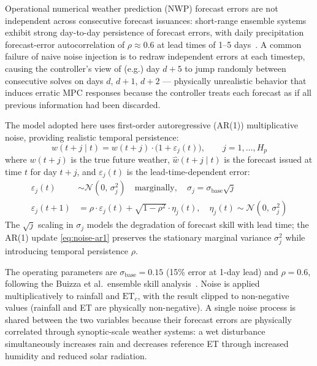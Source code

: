 Operational numerical weather prediction (NWP) forecast errors are not
independent across consecutive forecast issuances: short-range ensemble
systems exhibit strong day-to-day persistence of forecast errors, with daily
precipitation forecast-error autocorrelation of $\rho \approx 0.6$ at
lead times of 1--5 days~\cite{buizza2005}. A common failure of naive noise
injection is to redraw independent errors at each timestep, causing the
controller's view of (e.g.) day $d+5$ to jump randomly between consecutive
solves on days $d$, $d+1$, $d+2$ — physically unrealistic behavior that
induces erratic MPC responses because the controller treats each forecast as
if all previous information had been discarded.

The model adopted here uses first-order autoregressive (AR(1)) multiplicative
noise, providing realistic temporal persistence:
\begin{equation}
\hat{w}(t+j \mid t) = w(t+j) \cdot \bigl(1 + \varepsilon_j(t)\bigr),
\qquad j = 1, \ldots, H_p
\label{eq:noisy-forecast}
\end{equation}
where $w(t+j)$ is the true future weather, $\hat{w}(t+j \mid t)$ is the
forecast issued at time $t$ for day $t+j$, and $\varepsilon_j(t)$ is the
lead-time-dependent error:
\begin{align}
\varepsilon_j(t) &\sim \mathcal{N}(0,\, \sigma_j^2) \quad \text{marginally},
  \quad \sigma_j = \sigma_{\mathrm{base}} \sqrt{j}
  \label{eq:noise-marginal}\\
\varepsilon_j(t+1) &= \rho \cdot \varepsilon_j(t)
  + \sqrt{1 - \rho^2} \cdot \eta_j(t), \quad
  \eta_j(t) \sim \mathcal{N}(0,\, \sigma_j^2)
  \label{eq:noise-ar1}
\end{align}
The $\sqrt{j}$ scaling in $\sigma_j$ models the degradation of forecast
skill with lead time; the AR(1) update \eqref{eq:noise-ar1} preserves the
stationary marginal variance $\sigma_j^2$ while introducing temporal
persistence $\rho$.

The operating parameters are $\sigma_{\mathrm{base}} = 0.15$ (15\% error at
1-day lead) and $\rho = 0.6$, following the Buizza et al.\ ensemble
skill analysis~\cite{buizza2005}. Noise is applied multiplicatively to
rainfall and $\mathrm{ET}_c$, with the result clipped to non-negative values
(rainfall and ET are physically non-negative). A single noise process is
shared between the two variables because their forecast errors are physically
correlated through synoptic-scale weather systems: a wet disturbance
simultaneously increases rain and decreases reference ET through increased
humidity and reduced solar radiation.

